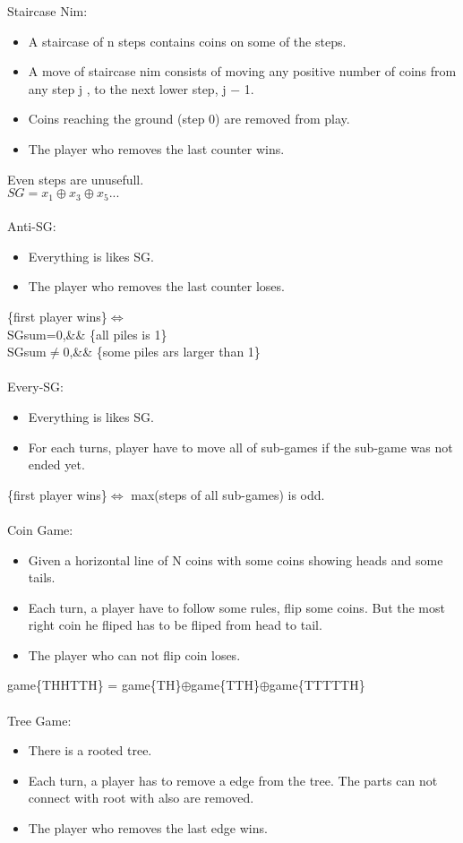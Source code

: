 Staircase Nim:
    \begin{itemize}
    \item A staircase of n steps contains coins on some of the steps.
    \item A move of staircase nim consists of moving any positive number of coins from any step j , to the next lower step, j − 1.
    \item Coins reaching the ground (step 0) are removed from play.
    \item The player who removes the last counter wins.
    \end{itemize}
    Even steps are unusefull.\\
    $SG=x_1\oplus x_3\oplus x_5...$\\
\\
Anti-SG:
\begin{itemize}
\item Everything is likes SG.
\item The player who removes the last counter loses.
\end{itemize}
\{first player wins\}$\iff$\\
        SGsum=0,\&\& \{all piles is 1\}\\
     SGsum$\neq$0,\&\& \{some piles ars larger than 1\}\\
     \\
Every-SG:
\begin{itemize}
\item Everything is likes SG.
\item For each turns, player have to move all of sub-games if the sub-game was not ended yet.
\end{itemize}
\{first player wins\}$\iff$ max(steps of all sub-games) is odd.\\
\\
Coin Game:
\begin{itemize}
\item Given a horizontal line of N coins with some coins showing heads and some tails.
\item Each turn, a player have to follow some rules, flip some coins. But the most right coin he fliped has to be fliped from head to tail.
\item The player who can not flip coin loses.
\end{itemize}
game\{THHTTH\} = game\{TH\}$\oplus$game\{TTH\}$\oplus$game\{TTTTTH\}\\
        \\
Tree Game:
\begin{itemize}
\item There is a rooted tree.
\item Each turn, a player has to remove a edge from the tree. The parts can not connect with root with also are removed.
\item The player who removes the last edge wins.
\end{itemize}
